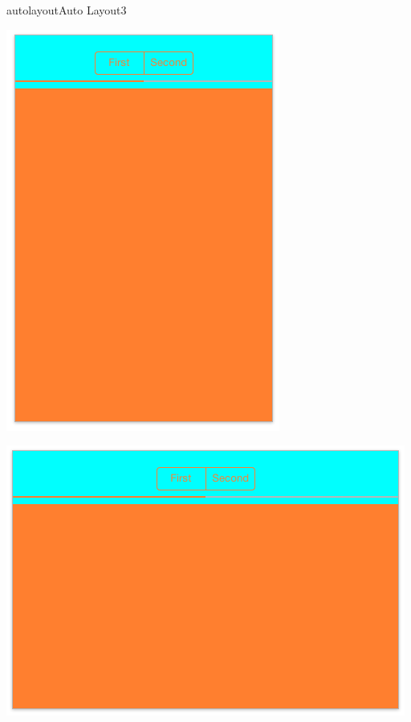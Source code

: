 \documentclass[parskip=half, final]{scrreprt}
\begin{document}
\begin{lecture}
\begin{exc}
\begin{excitem}{autolayout}{Auto Layout}{3}
\begin{enumerate}
\begin{minipage}{.5\linewidth}
  \centering
  \includegraphics[width=\linewidth, height=\linewidth, keepaspectratio]{img/al_21.png}
\end{minipage}
\begin{minipage}{.5\linewidth}
  \centering
  \includegraphics[width=\linewidth, height=\linewidth, keepaspectratio]{img/al_22.png}
\end{minipage}


\end{enumerate}
\end{excitem}
\end{exc}
\end{lecture}
\end{document}
